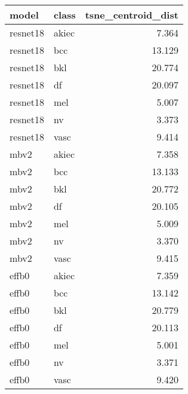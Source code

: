 \begin{tabular}{llr}
\toprule
model & class & tsne_centroid_dist \\
\midrule
resnet18 & akiec & 7.364 \\
resnet18 & bcc & 13.129 \\
resnet18 & bkl & 20.774 \\
resnet18 & df & 20.097 \\
resnet18 & mel & 5.007 \\
resnet18 & nv & 3.373 \\
resnet18 & vasc & 9.414 \\
mbv2 & akiec & 7.358 \\
mbv2 & bcc & 13.133 \\
mbv2 & bkl & 20.772 \\
mbv2 & df & 20.105 \\
mbv2 & mel & 5.009 \\
mbv2 & nv & 3.370 \\
mbv2 & vasc & 9.415 \\
effb0 & akiec & 7.359 \\
effb0 & bcc & 13.142 \\
effb0 & bkl & 20.779 \\
effb0 & df & 20.113 \\
effb0 & mel & 5.001 \\
effb0 & nv & 3.371 \\
effb0 & vasc & 9.420 \\
\bottomrule
\end{tabular}
